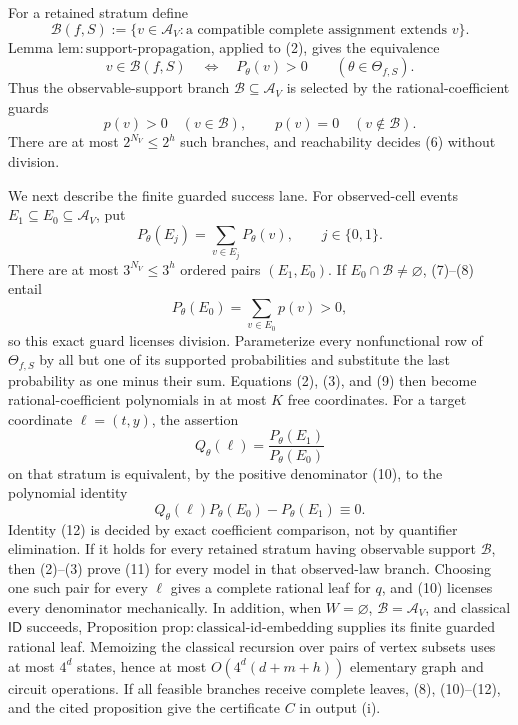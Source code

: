 For a retained stratum define
\[
 \mathcal B(f,S)
 :=\{v\in\mathcal A_V:\text{a compatible complete assignment extends }v\}.
 \tag{6}
\]
Lemma \(\mathrm{lem:support\text{-}propagation}\), applied to (2), gives the equivalence
\[
 v\in\mathcal B(f,S)
 \quad\Longleftrightarrow\quad
 P_\theta(v)>0
 \qquad(\theta\in\Theta_{f,S}).
 \tag{7}
\]
Thus the observable-support branch \(\mathcal B\subseteq\mathcal A_V\) is selected by the rational-coefficient guards
\[
 p(v)>0\quad(v\in\mathcal B),
 \qquad
 p(v)=0\quad(v\notin\mathcal B).
 \tag{8}
\]
There are at most \(2^{N_V}\le2^h\) such branches, and reachability decides (6) without division.

We next describe the finite guarded success lane. For observed-cell events \(E_1\subseteq E_0\subseteq\mathcal A_V\), put
\[
 P_\theta(E_j)=\sum_{v\in E_j}P_\theta(v),
 \qquad j\in\{0,1\}.
 \tag{9}
\]
There are at most \(3^{N_V}\le3^h\) ordered pairs \((E_1,E_0)\). If \(E_0\cap\mathcal B\ne\varnothing\), (7)--(8) entail
\[
 P_\theta(E_0)=\sum_{v\in E_0}p(v)>0,
 \tag{10}
\]
so this exact guard licenses division. Parameterize every nonfunctional row of \(\Theta_{f,S}\) by all but one of its supported probabilities and substitute the last probability as one minus their sum. Equations (2), (3), and (9) then become rational-coefficient polynomials in at most \(K\) free coordinates. For a target coordinate \(\ell=(t,y)\), the assertion
\[
 Q_\theta(\ell)
 =\frac{P_\theta(E_1)}{P_\theta(E_0)}
 \tag{11}
\]
on that stratum is equivalent, by the positive denominator (10), to the polynomial identity
\[
 Q_\theta(\ell)P_\theta(E_0)-P_\theta(E_1)\equiv0.
 \tag{12}
\]
Identity (12) is decided by exact coefficient comparison, not by quantifier elimination. If it holds for every retained stratum having observable support \(\mathcal B\), then (2)--(3) prove (11) for every model in that observed-law branch. Choosing one such pair for every \(\ell\) gives a complete rational leaf for \(q\), and (10) licenses every denominator mechanically. In addition, when \(W=\varnothing\), \(\mathcal B=\mathcal A_V\), and classical \(\mathsf{ID}\) succeeds, Proposition \(\mathrm{prop:classical\text{-}id\text{-}embedding}\) supplies its finite guarded rational leaf. Memoizing the classical recursion over pairs of vertex subsets uses at most \(4^d\) states, hence at most \(O(4^d(d+m+h))\) elementary graph and circuit operations. If all feasible branches receive complete leaves, (8), (10)--(12), and the cited proposition give the certificate \(C\) in output (i).

